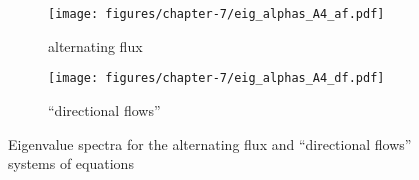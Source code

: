 \begin{figure}[!htb]
  \centering
  \begin{subfigure}{.45\textwidth}
    \centering
    \texttt{[image: figures/chapter-7/eig\_alphas\_A4\_af.pdf]}
    \caption{alternating flux}
    \label{fig:eigen_spectra_alpha_af}
  \end{subfigure}
  \begin{subfigure}{.45\textwidth}
    \centering
    \texttt{[image: figures/chapter-7/eig\_alphas\_A4\_df.pdf]}
    \caption{``directional flows''}
    \label{fig:eigen_spectra_alpha_df}
  \end{subfigure}
  \caption{Eigenvalue spectra for the alternating flux and ``directional flows'' \dG systems of equations} 
  \label{fig:eigen_spectra_alpha}
\end{figure}